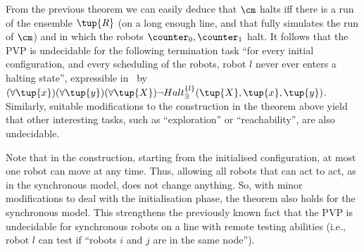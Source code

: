 From the previous theorem we can easily deduce that $\cm$ halts iff there is a run of the ensemble $\tup{R}$ (on a long enough line, and that fully simulates the run of $\cm$) and in which the robots $\counter_0, \counter_1$ halt. It follows that the PVP is undecidable for the following termination task ``for every initial configuration, and every scheduling of the robots, robot $l$ never ever enters a halting state'', expressible in \MRTL\ by $(\forall \tup{x}) (\forall \tup{y}) (\forall \tup{X}) \neg Halt^{\{l\}}_\exists(\tup{X},\tup{x},\tup{y})$. Similarly, suitable modifications to the construction in the theorem above yield that other interesting tasks, such as ``exploration'' or ``reachability'', are also undecidable.

\begin{remark} \label{rem:synch}
Note that in the construction, starting from the initialised configuration, at most one robot can move at any time. Thus, allowing all robots that can act to act, as in the synchronous model, does not change anything. So, with minor modifications to deal with the initialisation phase, the theorem also holds for the synchronous model. This strengthens the previously known fact that the PVP is undecidable for synchronous robots on a line with remote testing abilities (i.e., robot $l$ can test if ``robots $i$ and $j$ are in the same node'').
\end{remark}
